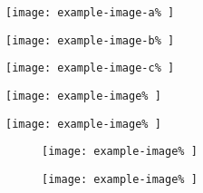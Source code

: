 \documentclass{article}
\let\vamaxheight\relax
\newlength{\vamaxheight%
	}%
\begin{document}
\begin{verticallyaligned}
	\noindent
	\begin{minipage}[b][\vamaxheight][b]{.30\textwidth%
		}
		\centering
		\texttt{[image: example-image-a\%
		]}%
	\end{minipage}
	\hfill
	\begin{minipage}[b][\vamaxheight][t]{.10\textwidth%
		}
		\centering
		\texttt{[image: example-image-b\%
		]}%
	\end{minipage}
	\hfill
	\begin{minipage}[b][\vamaxheight][t]{.20\textwidth%
		}
		\centering
		\texttt{[image: example-image-c\%
		]}%
	\end{minipage}
	\hfill
	\begin{minipage}[b][\vamaxheight][c]{.20\textwidth%
		}
		\centering
		\texttt{[image: example-image\%
		]}%
	\end{minipage}
	\hfill
	\begin{minipage}[b][\vamaxheight][t]{.20\textwidth%
		}
		\centering
		\texttt{[image: example-image\%
		]}%
	\end{minipage}
\end{verticallyaligned}

\lipsum[1]

\begin{figure}
	\begin{verticallyaligned}
		\noindent
		\begin{minipage}[b][\vamaxheight][c]{.50\textwidth%
			}
			\centering
			\texttt{[image: example-image\%
			]}%
			\caption{%
			}%
		\end{minipage}
		\hfill
		\begin{minipage}[b][\vamaxheight][t]{.40\textwidth%
			}
			\centering
			\texttt{[image: example-image\%
			]}%
			\caption{%
			}%
		\end{minipage}
	\end{verticallyaligned}
	\caption{%
	}%
\end{figure}
\end{document}
